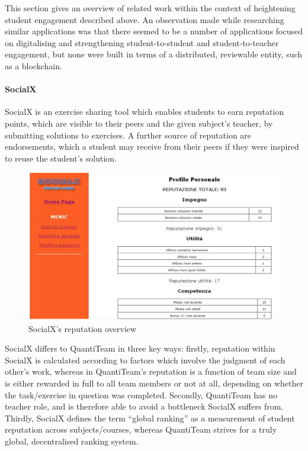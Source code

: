 \documentclass[12pt]{report}
\let\oldparagraph\paragraph
\renewcommand{\paragraph}[1]{\oldparagraph{#1}\mbox{}}
\begin{document}
This section gives an overview of related work within the context of
heightening student engagement described above. An observation made
while researching similar applications was that there seemed to be a
number of applications focused on digitalising and strengthening
student-to-student and student-to-teacher engagement, but none were
built in terms of a distributed, reviewable entity, such as a
blockchain.


\paragraph{SocialX}\label{socialx}

SocialX\cite{Temperini2008}\cite{Sterbini2009} is an exercise sharing tool which enables students to earn
reputation points, which are visible to their peers and the given
subject's teacher, by submitting solutions to exercises. A further
source of reputation are endorsements, which a student may receive from
their peers if they were inspired to reuse the student's solution.

\begin{figure}[htbp]
\centering
\includegraphics{../screenshots/socialx.png}
\caption{SocialX's reputation overview}
\end{figure}

SocialX differs to QuantiTeam in three key ways: firstly, reputation
within SocialX is calculated according to factors which involve the
judgment of each other's work, whereas in QuantiTeam's reputation is a
function of team size and is either rewarded in full to all team members
or not at all, depending on whether the task/exercise in question was
completed. Secondly, QuantiTeam has no teacher role, and is therefore
able to avoid a bottleneck SocialX suffers from. Thirdly, SocialX
defines the term ``global ranking'' as a measurement of student
reputation across subjects/courses, whereas QuantiTeam strives for a
truly global, decentralised ranking system.
\end{document}
